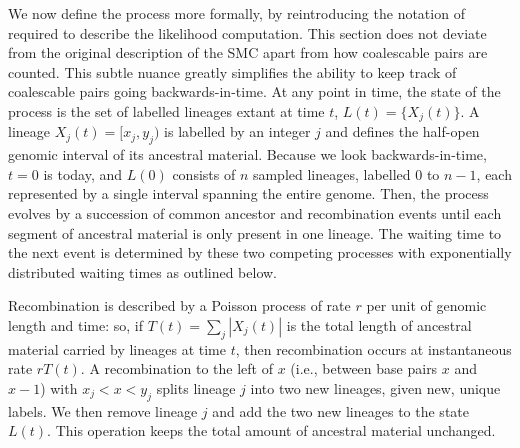 \documentclass{article}
\begin{document}
We now define the process more formally, by reintroducing
the notation of \citet{mcvean_approximating_2005} required to describe
the likelihood computation. This section
does not deviate from the original description of the SMC apart from
how coalescable pairs are counted. This subtle nuance
greatly simplifies the ability to keep track of coalescable pairs going
backwards-in-time.
At any point in time, the state of the process is
the set of labelled lineages extant at time $t$,
$L(t) = \{X_j(t)\}$.
A lineage $X_j(t) = [x_{j}, y_{j})$ is labelled by
an integer $j$ and defines the
half-open genomic interval of its ancestral material.
Because we look backwards-in-time, $t=0$ is today, and
$L(0)$ consists of $n$ sampled lineages, labelled $0$ to $n-1$,
each represented by a single interval spanning the entire genome.
Then, the process evolves by a succession of common ancestor and recombination
events until each segment of ancestral material is only present in one lineage.
The waiting time to the next event is determined by these two competing processes
with exponentially distributed waiting times as outlined below.

Recombination is described by a Poisson process of rate $r$ per unit
of genomic length and time:
so, if $T(t) = \sum_j |X_j(t)|$ is the total length of ancestral material
carried by lineages at time $t$,
then recombination occurs at instantaneous rate $rT(t)$.
A recombination to the left of $x$
(i.e., between base pairs $x$ and $x-1$)
with $x_{j} < x <y_{j}$ splits lineage $j$ into two new lineages,
given new, unique labels. We then remove lineage $j$
and add the two new lineages to the state $L(t)$.
This operation keeps the total amount of ancestral material unchanged.
\end{document}
